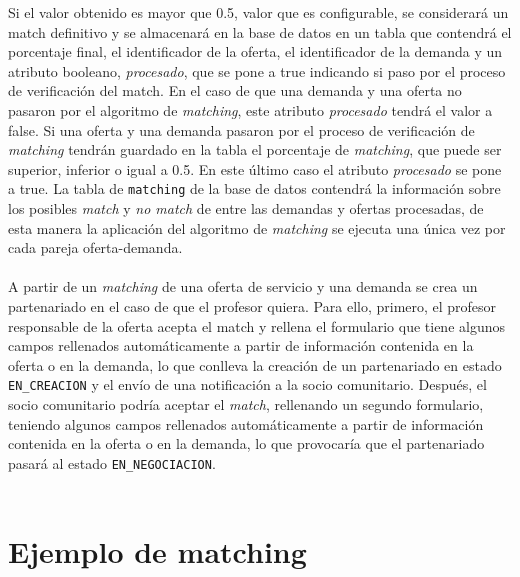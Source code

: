 \documentclass[11pt]{book}
\begin{document}
Si el valor obtenido es mayor que 0.5, valor que es configurable, se considerará un match definitivo y se almacenará en la base de datos en un tabla que contendrá el porcentaje final, el identificador de la oferta, el identificador de la demanda y un atributo booleano, \emph{procesado}, que se pone a true indicando si paso por el proceso de verificación del match. En el caso de que una demanda y una oferta no pasaron por el algoritmo de \emph{matching}, este atributo \emph{procesado} tendrá el valor a false. Si una oferta y una demanda pasaron por el proceso de verificación de \emph{matching} tendrán guardado en la tabla el porcentaje de \emph{matching}, que puede ser superior, inferior o igual a 0.5. En este último caso el atributo \emph{procesado} se pone a true. La tabla de \texttt{matching} de la base de datos contendrá la información sobre los posibles \emph{match} y \emph{no match} de entre las demandas y ofertas procesadas, de esta manera la aplicación del algoritmo de \emph{matching} se ejecuta una única vez por cada pareja oferta-demanda. \\\\

A partir de un \emph{matching} de una oferta de servicio y una demanda se crea un partenariado en el caso de que el profesor quiera. Para ello, primero, el profesor responsable de la oferta acepta el match y rellena el formulario que tiene  algunos campos rellenados automáticamente a partir de información contenida en la oferta o en la demanda, lo que conlleva la creación de un partenariado en estado \texttt{EN\_CREACION} y el envío de una notificación a la socio comunitario. Después, el socio comunitario podría aceptar el \emph{match}, rellenando un segundo formulario, teniendo algunos campos rellenados automáticamente a partir de información contenida en la oferta o en la demanda, lo que provocaría que el partenariado pasará al estado \texttt{EN\_NEGOCIACION}.\\\\

\section{Ejemplo de matching}
\end{document}
